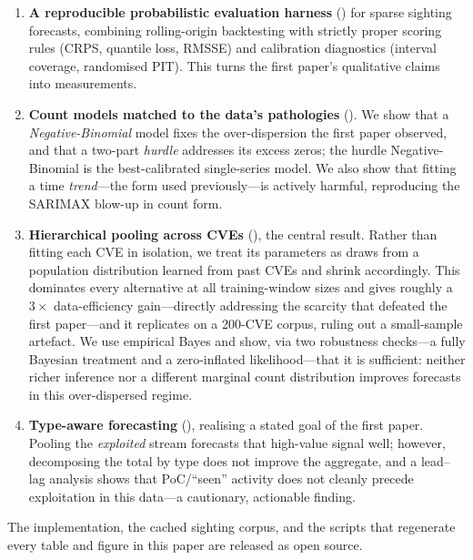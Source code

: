 \documentclass[]{article}
\begin{document}
\begin{enumerate}
  \item \textbf{A reproducible probabilistic evaluation harness}
  () for sparse sighting forecasts, combining rolling-origin
  backtesting with strictly proper scoring rules (CRPS, quantile loss, RMSSE)
  and calibration diagnostics (interval coverage, randomised PIT). This turns the
  first paper's qualitative claims into measurements.

  \item \textbf{Count models matched to the data's pathologies}
  (). We show that a \emph{Negative-Binomial} model
  fixes the over-dispersion the first paper observed, and that a two-part
  \emph{hurdle} addresses its excess zeros; the hurdle Negative-Binomial is the
  best-calibrated single-series model. We also show that fitting a time
  \emph{trend}---the form used previously---is actively harmful, reproducing the
  SARIMAX blow-up in count form.

  \item \textbf{Hierarchical pooling across CVEs} (), the
  central result. Rather than fitting each CVE in isolation, we treat its
  parameters as draws from a population distribution learned from past CVEs and
  shrink accordingly. This dominates every alternative at all training-window
  sizes and gives roughly a $3\times$ data-efficiency gain---directly addressing
  the scarcity that defeated the first paper---and it replicates on a 200-CVE
  corpus, ruling out a small-sample artefact. We use empirical Bayes and show, via
  two robustness checks---a fully Bayesian treatment and a zero-inflated
  likelihood---that it is sufficient: neither richer inference nor a different
  marginal count distribution improves forecasts in this over-dispersed regime.

  \item \textbf{Type-aware forecasting} (), realising a stated
  goal of the first paper. Pooling the \emph{exploited} stream forecasts that
  high-value signal well; however, decomposing the total by type does not improve
  the aggregate, and a lead--lag analysis shows that PoC/``seen'' activity does
  not cleanly precede exploitation in this data---a cautionary, actionable
  finding.
\end{enumerate}

\noindent The implementation, the cached sighting corpus, and the scripts that
regenerate every table and figure in this paper are released as open source.
\end{document}
